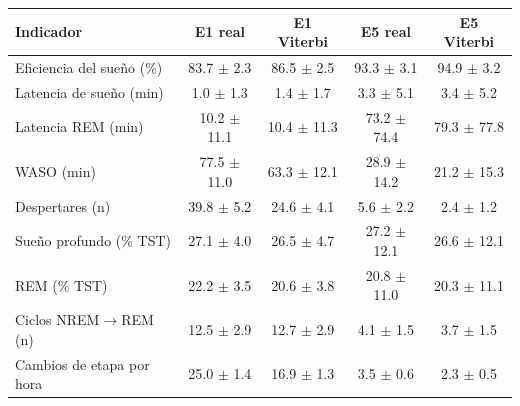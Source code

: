 \begin{tabular}{lcccc}
\toprule
\textbf{Indicador} & \textbf{E1 real} & \textbf{E1 Viterbi} & \textbf{E5 real} & \textbf{E5 Viterbi} \\
\midrule
Eficiencia del sueño (\%) & 83.7 $\pm$ 2.3 & 86.5 $\pm$ 2.5 & 93.3 $\pm$ 3.1 & 94.9 $\pm$ 3.2 \\
Latencia de sueño (min) & 1.0 $\pm$ 1.3 & 1.4 $\pm$ 1.7 & 3.3 $\pm$ 5.1 & 3.4 $\pm$ 5.2 \\
Latencia REM (min) & 10.2 $\pm$ 11.1 & 10.4 $\pm$ 11.3 & 73.2 $\pm$ 74.4 & 79.3 $\pm$ 77.8 \\
WASO (min) & 77.5 $\pm$ 11.0 & 63.3 $\pm$ 12.1 & 28.9 $\pm$ 14.2 & 21.2 $\pm$ 15.3 \\
Despertares (n) & 39.8 $\pm$ 5.2 & 24.6 $\pm$ 4.1 & 5.6 $\pm$ 2.2 & 2.4 $\pm$ 1.2 \\
Sueño profundo (\% TST) & 27.1 $\pm$ 4.0 & 26.5 $\pm$ 4.7 & 27.2 $\pm$ 12.1 & 26.6 $\pm$ 12.1 \\
REM (\% TST) & 22.2 $\pm$ 3.5 & 20.6 $\pm$ 3.8 & 20.8 $\pm$ 11.0 & 20.3 $\pm$ 11.1 \\
Ciclos NREM$\to$REM (n) & 12.5 $\pm$ 2.9 & 12.7 $\pm$ 2.9 & 4.1 $\pm$ 1.5 & 3.7 $\pm$ 1.5 \\
Cambios de etapa por hora & 25.0 $\pm$ 1.4 & 16.9 $\pm$ 1.3 & 3.5 $\pm$ 0.6 & 2.3 $\pm$ 0.5 \\
\bottomrule
\end{tabular}
